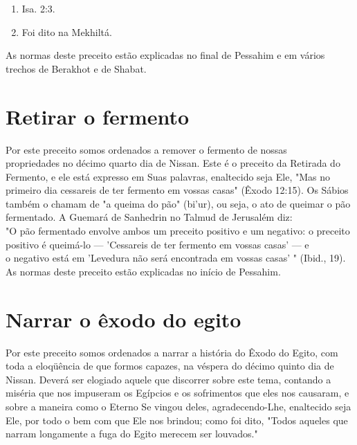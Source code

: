 \begin{itemize}
\begin{enumrate}
\begin{itemize}
\begin{itemize}
\begin{itemize}
\begin{enumerate}
\def\labelenumi{\arabic{enumi}.}
\setcounter{enumi}{180}
\item
 
 Isa. 2:3.
 
\item
 
 Foi dito na Mekhiltá.
 
\end{enumerate}




As normas deste preceito estão explicadas no final de Pessahim e em
vários trechos de Berakhot e de Shabat.

\section{Retirar o fermento}

Por este preceito somos ordenados a remover o fermento de nossas\\
propriedades no décimo quarto dia de Nissan. Este é o preceito da
Retirada do\\
Fermento, e ele está expresso em Suas palavras, enaltecido seja Ele,
"Mas no\\
primeiro dia cessareis de ter fermento em vossas casas" (Êxodo 12:15).
Os Sábios
também o chamam de "a queima do pão" (bi'ur), ou seja, o ato de
queimar
o pão fermentado. A Guemará de Sanhedrin no Talmud de Jerusalém
diz:\\
"O pão fermentado envolve ambos um preceito positivo e um negativo: o
preceito
positivo é queimá-lo --- 'Cessareis de ter fermento em vossas
casas' --- e\\
o negativo está em 'Levedura não será encontrada em vossas casas' "
(Ibid., 19).\\
As normas deste preceito estão explicadas no início de Pessahim.


\section{Narrar o êxodo do egito}

Por este preceito somos ordenados a narrar a história do Êxodo do Egito,
com toda a eloqüência de que formos capazes, na véspera do décimo quinto
dia de Nissan. Deverá ser elogiado aquele que discorrer sobre este tema,
contan­do a miséria que nos impuseram os Egípcios e os sofrimentos que
eles nos cau­saram, e sobre a maneira como o Eterno Se vingou deles,
agradecendo-Lhe, enal­tecido seja Ele, por todo o bem com que Ele nos
brindou; como foi dito, "To­dos aqueles que narram longamente a fuga do
Egito merecem ser louvados."


\end{itemize}
\end{itemize}
\end{itemize}
\end{enumrate}
\end{itemize}
